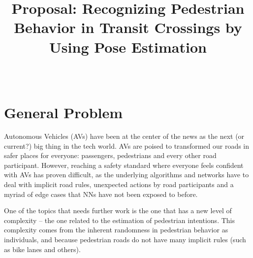 \documentclass[conference, onecolumn]{IEEEtran}
\begin{document}

\title{Proposal: Recognizing Pedestrian Behavior in Transit Crossings by Using Pose Estimation}

\author{%
  \\
}


\maketitle

%
%

\section{General Problem}\label{sec:general-problem}
Autonomous Vehicles (AVs) have been at the center of the news as the next (or current?) big thing in the tech world. AVs are poised to transformed our roads in safer places for everyone: passengers, pedestrians and every other road participant. However, reaching a safety standard where everyone feels confident with AVs has proven difficult, as the underlying algorithms and networks have to deal with implicit road rules, unexpected actions by road participants and a myriad of edge cases that NNs have not been exposed to before.

One of the topics that needs further work is the one that has a new level of complexity – the one related to the estimation of pedestrian intentions. This complexity comes from the inherent randomness in pedestrian behavior as individuals, and because pedestrian roads do not have many implicit rules (such as bike lanes and others).
\end{document}
